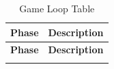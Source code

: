 
\begin{longtable}{|p{}|p{}|}
\hline
\textbf{Phase} & \textbf{Description} \\
\hline
\endfirsthead

\hline
\textbf{Phase} & \textbf{Description} \\
\hline
\endhead

\hline
\endfoot


\caption{Game Loop Table}
\label{tab:game_loop}
\end{longtable}
